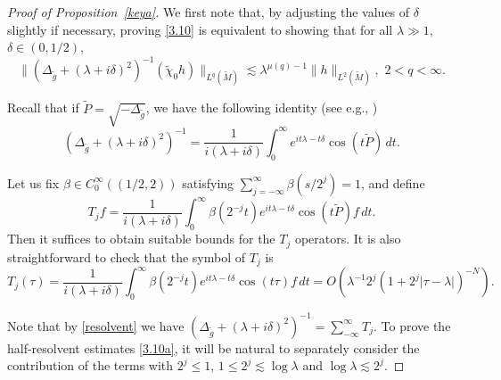 \documentclass[10pt]{amsart}
\newcommand{\la}{\lambda}
\newcommand{\1}{{\bf 1}}
\begin{document}
\begin{proof}[Proof of Proposition~\ref{keya}]


We first note that, by adjusting the values of $\delta$ slightly if necessary, proving \eqref{3.10} is equivalent to 
showing that  for all $\la\gg 1$, {$\delta \in ( 0,1/2)$},
\begin{equation}\label{3.10a}
\| (\Delta_{\tilde g}+(\la+i\delta)^2)^{-1} (\tilde \chi_0 h)\|_{L^q(\tilde M)}\lesssim 
    \la^{\mu(q)-1}\|h\|_{L^2(\tilde M)}, \,\, 2<q<\infty.
\end{equation}


Recall that if $\tilde P=\sqrt{-\Delta_{\tilde g}}$, we have the following identity (see e.g., \cite{BSSY})
\begin{equation}\label{resolvent}
    \left(\Delta_{\tilde g}+(\la+i\delta)^2\right)^{-1}=\frac1{i(\la+i\delta)}\int_0^\infty e^{it\la-t\delta}\cos (t\tilde P)\,dt.
\end{equation}




Let us fix $\beta\in C_0^\infty ((1/2, 2))$ satisfying $\sum_{j=-\infty}^\infty \beta(s/2^j)=1$, and 
define 
\begin{equation}\label{tj}
T_j f=\frac1{i(\la+i\delta)}\int_0^\infty \beta(2^{-j}t)e^{it\la-t\delta}\cos (t\tilde P)f\,dt.
\end{equation}
Then it suffices to obtain suitable bounds for the $T_j$ operators.  It is also straightforward to check that the symbol of $T_j$ is 
\begin{equation}\label{symbol}
    T_j(\tau)=\frac1{i(\la+i\delta)}\int_0^\infty \beta(2^{-j}t)e^{it\la-t\delta}\cos (t\tau)f\,dt=O(\la^{-1}2^j(1+2^j|\tau-\la|)^{-N}).
\end{equation}



Note that by \eqref{resolvent} we have $(\Delta_{\tilde g}+(\la+i\delta)^2)^{-1}=\sum_{-\infty}^\infty T_j$.  To prove the
half-resolvent estimates \eqref{3.10a}, it will be natural to separately consider
the contribution of the terms with
$2^j\le 1$, $1\le 2^j\lesssim \log \la$ and $\log\la \lesssim 2^j$.




\end{proof}
\end{document}

